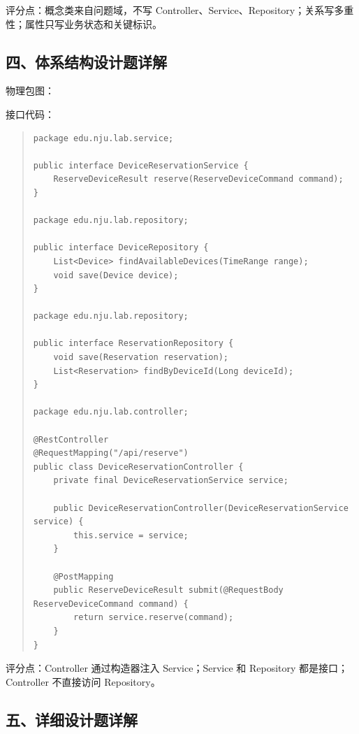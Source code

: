 \documentclass[UTF8,zihao=-4]{ctexart}
\begin{document}
评分点：概念类来自问题域，不写 Controller、Service、Repository；关系写多重性；属性只写业务状态和关键标识。


\subsection{四、体系结构设计题详解}


物理包图：





接口代码：


\begin{quote}
\footnotesize
\begin{verbatim}
package edu.nju.lab.service;

public interface DeviceReservationService {
    ReserveDeviceResult reserve(ReserveDeviceCommand command);
}

package edu.nju.lab.repository;

public interface DeviceRepository {
    List<Device> findAvailableDevices(TimeRange range);
    void save(Device device);
}

package edu.nju.lab.repository;

public interface ReservationRepository {
    void save(Reservation reservation);
    List<Reservation> findByDeviceId(Long deviceId);
}

package edu.nju.lab.controller;

@RestController
@RequestMapping("/api/reserve")
public class DeviceReservationController {
    private final DeviceReservationService service;

    public DeviceReservationController(DeviceReservationService service) {
        this.service = service;
    }

    @PostMapping
    public ReserveDeviceResult submit(@RequestBody ReserveDeviceCommand command) {
        return service.reserve(command);
    }
}
\end{verbatim}
\end{quote}



评分点：Controller 通过构造器注入 Service；Service 和 Repository 都是接口；Controller 不直接访问 Repository。


\subsection{五、详细设计题详解}
\end{document}
